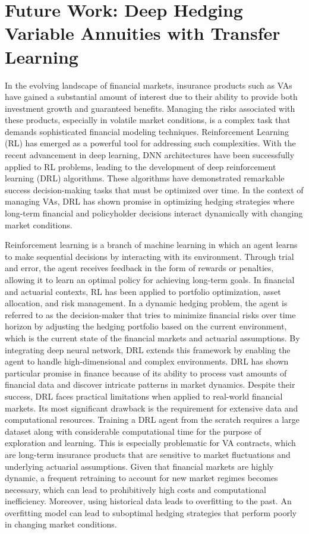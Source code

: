 \chapter{Future Work: Deep Hedging Variable Annuities with Transfer Learning} \label{chap:futureWork}

In the evolving landscape of financial markets, insurance products such as VAs have gained a substantial amount of interest due to their ability to provide both investment growth and guaranteed benefits. 
Managing the risks associated with these products, especially in volatile market conditions, is a complex task that demands sophisticated financial modeling techniques. 
Reinforcement Learning (RL) has emerged as a powerful tool for addressing such complexities. With the recent advancement in deep learning, DNN architectures have been successfully applied to RL problems, leading to the development of deep reinforcement learning (DRL) algorithms. 
These algorithms have demonstrated remarkable success decision-making tasks that must be optimized over time. 
In the context of managing VAs, DRL has shown promise in optimizing hedging strategies where long-term financial and policyholder decisions interact dynamically with changing market conditions.

Reinforcement learning is a branch of machine learning in which an agent learns to make sequential decisions by interacting with its environment. 
Through trial and error, the agent receives feedback in the form of rewards or penalties, allowing it to learn an optimal policy for achieving long-term goals. 
In financial and actuarial contexts, RL has been applied to portfolio optimization, asset allocation, and risk management. 
In a dynamic hedging problem, the agent is referred to as the decision-maker that tries to minimize financial risks over time horizon by adjusting the hedging portfolio based on the current environment, which is the current state of the financial markets and actuarial assumptions.
By integrating deep neural network, DRL extends this framework by enabling the agent to handle high-dimensional and complex environments. 
DRL has shown particular promise in finance because of its ability to process vast amounts of financial data and discover intricate patterns in market dynamics.
Despite their success, DRL faces practical limitations when applied to real-world financial markets.
Its most significant drawback is the requirement for extensive data and computational resources.
Training a DRL agent from the scratch requires a large dataset along with considerable computational time for the purpose of exploration and learning.
This is especially problematic for VA contracts, which are long-term insurance products that are sensitive to market fluctuations and underlying actuarial assumptions.
Given that financial markets are highly dynamic, a frequent retraining to account for new market regimes becomes necessary, which can lead to prohibitively high costs and computational inefficiency.
Moreover, using historical data leads to overfitting to the past. 
An overfitting model can lead to suboptimal hedging strategies that perform poorly in changing market conditions.

